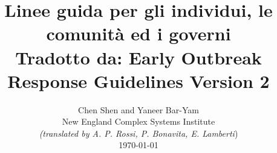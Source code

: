 \documentclass[onecolumn,journal]{IEEEtran}
\begin{document}
\title{\color{Brown}  Linee guida per gli individui, le comunità ed i governi \\
Tradotto da: Early Outbreak Response Guidelines Version 2 \\
\vspace{-0.35ex}}
\author{Chen Shen and Yaneer Bar-Yam \\ New England Complex Systems Institute \\
\vspace{+0.35ex}
\small{\textit{(translated by A. P. Rossi, P. Bonavita, E. Lamberti})}\\
 \today
  \vspace{-8ex} \\
\textbf{}
 }

\maketitle




\thispagestyle{empty} %




\end{document}
